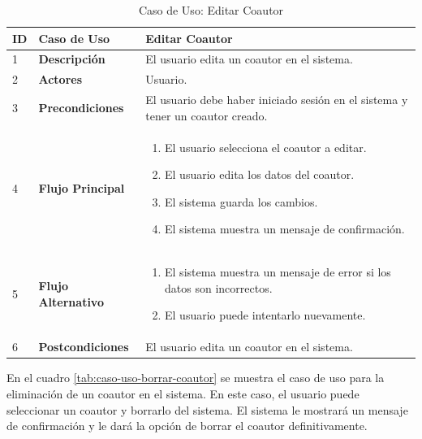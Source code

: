 \begin{table}[H]
    \centering
        \begin{tabular}{|p{0.5cm}|p{3.5cm}|p{10cm}|}
        \hline
        \textbf{ID} & \textbf{Caso de Uso} & \textbf{Editar Coautor} \\
        \hline
        1 & \textbf{Descripción} & El usuario edita un coautor en el sistema. \\
        \hline
        2 & \textbf{Actores} & Usuario. \\
        \hline
        3 & \textbf{Precondiciones} & El usuario debe haber iniciado sesión en el sistema y tener un coautor creado. \\
        \hline
        4 & \textbf{Flujo Principal} & 
        \begin{enumerate}
            \item El usuario selecciona el coautor a editar.
            \item El usuario edita los datos del coautor.
            \item El sistema guarda los cambios.
            \item El sistema muestra un mensaje de confirmación.
        \end{enumerate} \\
        \hline
        5 & \textbf{Flujo Alternativo} & 
        \begin{enumerate}
            \item El sistema muestra un mensaje de error si los datos son incorrectos.
            \item El usuario puede intentarlo nuevamente.
        \end{enumerate} \\
        \hline
        6 & \textbf{Postcondiciones} & El usuario edita un coautor en el sistema. \\
        \hline
    \end{tabular}
    \caption{Caso de Uso: Editar Coautor}
    \label{tab:caso-uso-editar-coautor}

\end{table}

En el cuadro \ref{tab:caso-uso-borrar-coautor} se muestra el caso de uso para la eliminación de un coautor en el sistema. En este caso, el usuario puede seleccionar un coautor y borrarlo del sistema. El sistema le mostrará un mensaje de confirmación y le dará la opción de borrar el coautor definitivamente.

